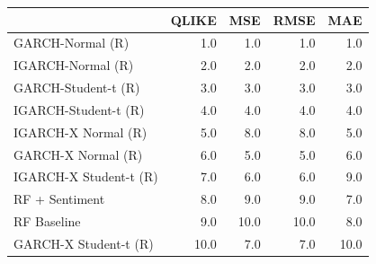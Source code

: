 \begin{table}[htbp]
\centering
\begin{tabular}{lrrrr}
\toprule
 & QLIKE & MSE & RMSE & MAE \\
\midrule
GARCH-Normal (R) & 1.0 & 1.0 & 1.0 & 1.0 \\
IGARCH-Normal (R) & 2.0 & 2.0 & 2.0 & 2.0 \\
GARCH-Student-t (R) & 3.0 & 3.0 & 3.0 & 3.0 \\
IGARCH-Student-t (R) & 4.0 & 4.0 & 4.0 & 4.0 \\
IGARCH-X Normal (R) & 5.0 & 8.0 & 8.0 & 5.0 \\
GARCH-X Normal (R) & 6.0 & 5.0 & 5.0 & 6.0 \\
IGARCH-X Student-t (R) & 7.0 & 6.0 & 6.0 & 9.0 \\
RF + Sentiment & 8.0 & 9.0 & 9.0 & 7.0 \\
RF Baseline & 9.0 & 10.0 & 10.0 & 8.0 \\
GARCH-X Student-t (R) & 10.0 & 7.0 & 7.0 & 10.0 \\
\bottomrule
\end{tabular}
\label{tab:forecast_loss_ranking}
\end{table}

